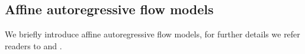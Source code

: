 \documentclass{article}
\begin{document}

 
\subsection{Affine autoregressive flow models}

We briefly introduce affine autoregressive flow models, for further details we refer readers to  
\cite{papamakarios2019normalizing} and \cite{kobyzev2019normalizing}. 
\end{document}
